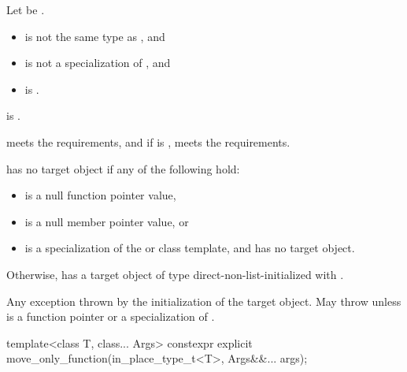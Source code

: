 \begin{itemdescr}
\pnum
Let  be .

\pnum
\constraints
\begin{itemize}
\item
{} is not the same type as , and
\item
{} is not a specialization of , and
\item
{} is .
\end{itemize}

\pnum
\mandates
{} is .

\pnum
\expects
{} meets the  requirements, and
if  is ,
 meets the  requirements.

\pnum
\ensures
{} has no target object if any of the following hold:
\begin{itemize}
\item
{} is a null function pointer value,
\item
{} is a null member pointer value, or
\item
{} is a specialization of
the  or  class template,
and  has no target object.
\end{itemize}
Otherwise,  has a target object of type 
direct-non-list-initialized with .

\pnum
\throws
Any exception thrown by the initialization of the target object.
May throw  unless  is
a function pointer or a specialization of .
\end{itemdescr}

%
\begin{itemdecl}
template<class T, class... Args>
  constexpr explicit move_only_function(in_place_type_t<T>, Args&&... args);
\end{itemdecl}

